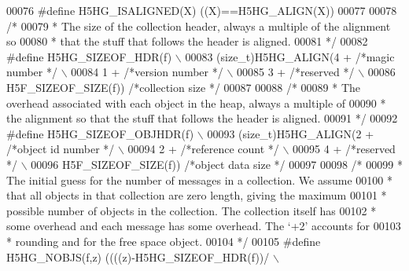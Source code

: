 \begin{DoxyCode}
00076 \textcolor{preprocessor}{#define H5HG\_ISALIGNED(X) ((X)==H5HG\_ALIGN(X))}
00077 
00078 \textcolor{comment}{/*}
00079 \textcolor{comment}{ * The size of the collection header, always a multiple of the alignment so}
00080 \textcolor{comment}{ * that the stuff that follows the header is aligned.}
00081 \textcolor{comment}{ */}
00082 \textcolor{preprocessor}{#define H5HG\_SIZEOF\_HDR(f)                            \(\backslash\)}
00083 \textcolor{preprocessor}{    (size\_t)H5HG\_ALIGN(4 +          }\textcolor{comment}{/*magic number      */}\textcolor{preprocessor}{ \(\backslash\)}
00084 \textcolor{preprocessor}{                       1 +          }\textcolor{comment}{/*version number    */}\textcolor{preprocessor}{ \(\backslash\)}
00085 \textcolor{preprocessor}{                       3 +          }\textcolor{comment}{/*reserved      */}\textcolor{preprocessor}{ \(\backslash\)}
00086 \textcolor{preprocessor}{                       H5F\_SIZEOF\_SIZE(f))  }\textcolor{comment}{/*collection size   */}\textcolor{preprocessor}{}
00087 
00088 \textcolor{comment}{/*}
00089 \textcolor{comment}{ * The overhead associated with each object in the heap, always a multiple of}
00090 \textcolor{comment}{ * the alignment so that the stuff that follows the header is aligned.}
00091 \textcolor{comment}{ */}
00092 \textcolor{preprocessor}{#define H5HG\_SIZEOF\_OBJHDR(f)                             \(\backslash\)}
00093 \textcolor{preprocessor}{    (size\_t)H5HG\_ALIGN(2 +          }\textcolor{comment}{/*object id number  */}\textcolor{preprocessor}{ \(\backslash\)}
00094 \textcolor{preprocessor}{                       2 +          }\textcolor{comment}{/*reference count   */}\textcolor{preprocessor}{ \(\backslash\)}
00095 \textcolor{preprocessor}{                       4 +          }\textcolor{comment}{/*reserved      */}\textcolor{preprocessor}{ \(\backslash\)}
00096 \textcolor{preprocessor}{                       H5F\_SIZEOF\_SIZE(f))  }\textcolor{comment}{/*object data size  */}\textcolor{preprocessor}{}
00097 
00098 \textcolor{comment}{/*}
00099 \textcolor{comment}{ * The initial guess for the number of messages in a collection.  We assume}
00100 \textcolor{comment}{ * that all objects in that collection are zero length, giving the maximum}
00101 \textcolor{comment}{ * possible number of objects in the collection.  The collection itself has}
00102 \textcolor{comment}{ * some overhead and each message has some overhead.  The `+2' accounts for}
00103 \textcolor{comment}{ * rounding and for the free space object.}
00104 \textcolor{comment}{ */}
00105 \textcolor{preprocessor}{#define H5HG\_NOBJS(f,z) ((((z)-H5HG\_SIZEOF\_HDR(f))/           \(\backslash\)}

\end{DoxyCode}
